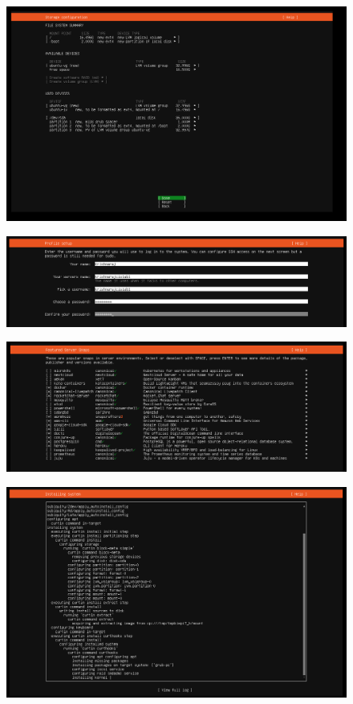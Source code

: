 \documentclass[11pt]{article}
\begin{document}
\begin{figure}[H]
    \centering
    \includegraphics[width=.95\textwidth]{screenshots/13.png}
    \caption{}
\end{figure}
\begin{figure}[H]
    \centering
    \includegraphics[width=.95\textwidth]{screenshots/14.png}
    \caption{}
\end{figure}
\begin{figure}[H]
    \centering
    \includegraphics[width=.95\textwidth]{screenshots/15.png}
    \caption{}
\end{figure}
\begin{figure}[H]
    \centering
    \includegraphics[width=.95\textwidth]{screenshots/16.png}
    \caption{}
\end{figure}
\end{document}
